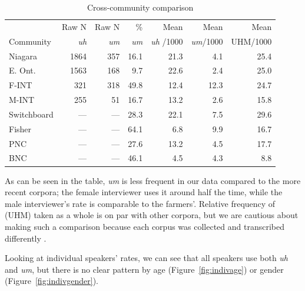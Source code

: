 \documentclass[11pt]{article}
\begin{document}
\begin{table}[ht!]
    \centering
    \begin{tabular}{lrrrrrr}
        \toprule
                    & Raw N       & Raw N       & \%          & Mean              & Mean             & Mean     \\
        Community   & \textit{uh} & \textit{um} & \textit{um} & \textit{uh} /1000 & \textit{um}/1000 & UHM/1000 \\
        \midrule
        Niagara     & 1864        & 357         & 16.1        & 21.3              & 4.1              & 25.4     \\
        E. Ont.     & 1563        & 168         & 9.7         & 22.6              & 2.4              & 25.0     \\
        F-INT       & 321         & 318         & 49.8        & 12.4              & 12.3             & 24.7     \\
        M-INT       & 255         & 51          & 16.7        & 13.2              & 2.6              & 15.8     \\
        \midrule
        Switchboard & ---         & ---         & 28.3        & 22.1              & 7.5              & 29.6     \\
        Fisher      & ---         & ---         & 64.1        & 6.8               & 9.9              & 16.7     \\
        PNC         & ---         & ---         & 27.6        & 13.2              & 4.5              & 17.7     \\
        BNC         & ---         & ---         & 46.1        & 4.5               & 4.3              & 8.8      \\
        \bottomrule
    \end{tabular}
    \caption{Cross-community comparison}
    \label{t:comparison}
\end{table}

As can be seen in the table, \emph{um} is less frequent in our data compared to
the more recent corpora; the female interviewer uses it around half the time,
while the male interviewer's rate is comparable to the farmers'.
Relative frequency of (UHM) taken as a whole is on par with other corpora, but
we are cautious about making such a comparison because each corpus was collected
and transcribed differently \parencite[for related discussion,
see][]{pichler2010}.

Looking at individual speakers' rates, we can see that all speakers use both
\emph{uh} and \emph{um}, but there is no clear pattern by age
(Figure~\ref{fig:indivage}) or gender (Figure~\ref{fig:indivgender}).
\end{document}

